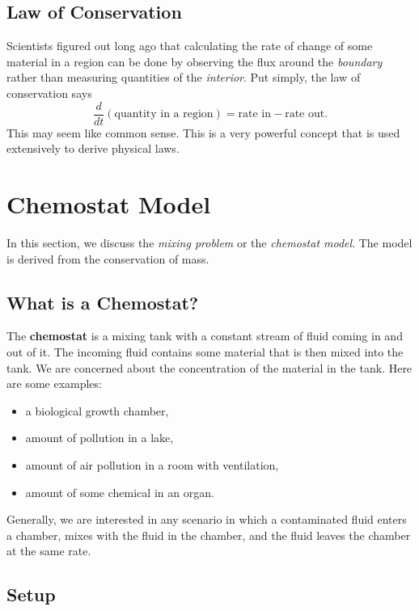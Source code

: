 \documentclass[10pt,letterpaper]{article}
\begin{document}
\subsection{Law of Conservation}
Scientists figured out long ago that calculating the rate of change of some material in a region can be done by observing the flux around the \textit{boundary} rather than measuring quantities of the \textit{interior}. Put simply, the law of conservation says
$$
\frac{d}{dt}(\text{quantity in a region}) = \text{rate in} - \text{rate out}. 
$$
This may seem like common sense. This is a very powerful concept that is used extensively to derive physical laws. 


\section{Chemostat Model}

In this section, we discuss the \textit{mixing problem} or the \textit{chemostat model}. The model is derived from the conservation of mass.

\subsection{What is a Chemostat?}

The \textbf{chemostat} is a mixing tank with a constant stream of fluid coming in and out of it. The incoming fluid contains some material that is then mixed into the tank. We are concerned about the concentration of the material in the tank. Here are some examples: 
\begin{itemize}
    \item a biological growth chamber,
    \item amount of pollution in a lake,
    \item amount of air pollution in a room with ventilation, 
    \item amount of some chemical in an organ.
\end{itemize}
Generally, we are interested in any scenario in which a contaminated fluid enters a chamber, mixes with the fluid in the chamber, and the fluid leaves the chamber at the same rate.

\subsection{Setup}
\end{document}
